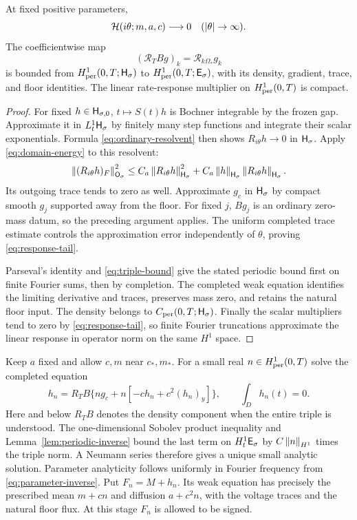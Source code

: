\begin{lemma}\label{lem:periodic-inverse}
At fixed positive parameters,
\begin{equation}\label{eq:response-tail}
 \mathcal H(i\theta;m,a,c)\longrightarrow0\quad(|\theta|\to\infty).
\end{equation}
The coefficientwise map
\[
 (\mathcal R_TBg)_k=\mathcal R_{k\Omega_*}g_k
\]
is bounded from $H^1_{\mathrm{per}}(0,T;\mathsf H_\sigma)$ to
$H^1_{\mathrm{per}}(0,T;\mathsf E_\sigma)$, with its density, gradient, trace, and
floor identities. The linear rate-response multiplier on
$H^1_{\mathrm{per}}(0,T)$ is compact.
\end{lemma}

\begin{proof}
For fixed $h\in\mathsf H_{\sigma,0}$, $t\mapsto S(t)h$ is Bochner
integrable by the frozen gap. Approximate it in $L^1_t\mathsf H_\sigma$
by finitely many step functions and integrate their scalar
exponentials. Formula \eqref{eq:ordinary-resolvent} then shows
$R_{i\theta}h\to0$ in $\mathsf H_\sigma$. Apply
\eqref{eq:domain-energy} to this resolvent:
\[
 \left\|(R_{i\theta}h)_F\right\|_{\mathsf O_\sigma}^2
 \le C_a\left\|R_{i\theta}h\right\|_{\mathsf H_\sigma}^2+
              C_a\left\|h\right\|_{\mathsf H_\sigma}\left\|R_{i\theta}h\right\|_{\mathsf H_\sigma}.
\]
Its outgoing trace tends to zero as well. Approximate $g_c$ in
$\mathsf H_\sigma$ by compact smooth $g_j$ supported away from the floor.
For fixed $j$, $Bg_j$ is an ordinary zero-mass datum, so the preceding
argument applies. The uniform completed trace estimate controls
the approximation error independently of $\theta$, proving
\eqref{eq:response-tail}.

Parseval's identity and \eqref{eq:triple-bound} give the stated
periodic bound first on finite Fourier sums, then by completion.
The completed weak equation identifies the limiting derivative
and traces, preserves mass zero, and retains the natural floor input.
The density belongs to $C_{\mathrm{per}}(0,T;\mathsf H_\sigma)$.
Finally the scalar multipliers tend to zero by
\eqref{eq:response-tail}, so finite Fourier truncations approximate
the linear response in operator norm on the same $H^1$ space.
\end{proof}

Keep $a$ fixed and allow $c,m$ near $c_*,m_*$. For a small real
$n\in H^1_{\mathrm{per}}(0,T)$ solve the completed equation
\begin{equation}\label{eq:nonlinear-response}
 h_n=R_TB\{n g_c+n[-c h_n+c^2(h_n)_y]\},\qquad \int_Dh_n(t)=0.
\end{equation}
Here and below $R_TB$ denotes the density component when the entire
triple is understood. The one-dimensional Sobolev product inequality
and Lemma~\ref{lem:periodic-inverse} bound the last term on
$H^1_t\mathsf E_\sigma$ by $C\left\|n\right\|_{H^1}$ times the triple norm.
A Neumann series therefore gives a unique small analytic solution.
Parameter analyticity follows uniformly in Fourier frequency from
\eqref{eq:parameter-inverse}. Put $F_n=M+h_n$. Its weak equation
has precisely the prescribed mean $m+cn$ and diffusion $a+c^2n$,
with the voltage traces and the natural floor flux. At this stage
$F_n$ is allowed to be signed.

